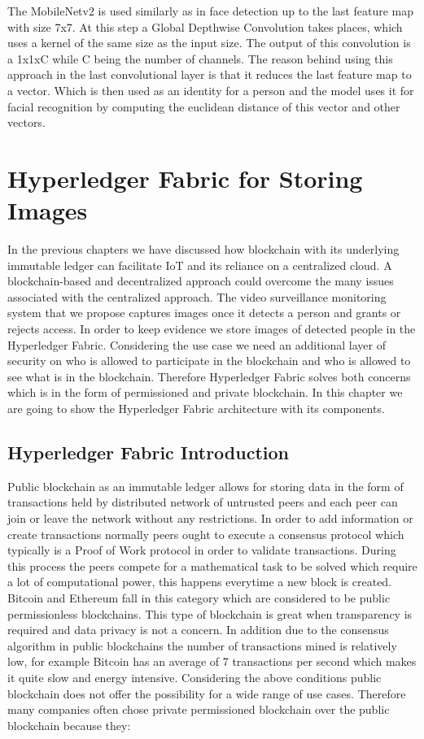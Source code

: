 The MobileNetv2 is used similarly as in face detection up to the last feature map with size 7x7. At this step a Global Depthwise Convolution takes places, which uses a kernel of the same size as the input size. The output of this convolution is a 1x1xC while C being the number of channels. The reason behind using this approach in the last convolutional layer is that it reduces the last feature map to a vector. Which is then used as an identity for a person and the model uses it for facial recognition by computing the euclidean distance of this vector and other vectors. 



\chapter{Hyperledger Fabric for Storing Images}



In the previous chapters we have discussed how blockchain with its underlying immutable ledger can facilitate IoT and its reliance on a centralized cloud. A blockchain-based and decentralized approach could overcome the many issues associated with the centralized approach. The video surveillance monitoring system that we propose captures images once it detects a person and grants or rejects access. In order to keep evidence we store images of detected people in the Hyperledger Fabric. Considering the use case we need an additional layer of security on who is allowed to participate in the blockchain and who is allowed to see what is in the blockchain. Therefore Hyperledger Fabric solves both concerns which is in the form of permissioned and private blockchain. In this chapter we are going to show the Hyperledger Fabric architecture with its components. 


\section{Hyperledger Fabric Introduction}
Public blockchain as an immutable ledger allows for storing data in the form of transactions held by distributed network of untrusted peers and each peer can join or leave the network without any restrictions. In order to add information or create transactions normally peers ought to execute a consensus protocol which typically is a Proof of Work protocol in order to validate transactions. During this process  the peers compete for a mathematical task to be solved which require a lot of computational power, this happens everytime a new block is created. Bitcoin and Ethereum fall in this category which are considered to be public permissionless blockchains. This type of blockchain is great when transparency is required and data privacy is not a concern. 
In addition due to the consensus algorithm in public blockchains the number of transactions mined is relatively low, for example Bitcoin has an average of 7 transactions per second which makes it quite slow and energy intensive. Considering the above conditions public blockchain does not offer the possibility for a wide range of use cases. Therefore many companies often chose private permissioned blockchain over the public blockchain because they: 


